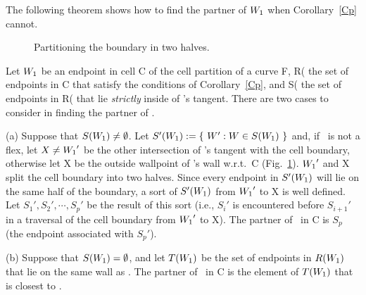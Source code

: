 The following theorem shows how to find the partner of $\mbox{$W_{1}$}$ when Corollary~\ref{Cp} cannot.

\begin{figure}[htb]\vspace{2.1in}\caption{Partitioning the boundary in two halves.}\label{3.8A}\end{figure}

\begin{theorem}
\label{Tpner}
Let $\mbox{$W_{1}$}$ be an endpoint in cell C of the cell partition of a curve F,
R{\rm (}\wo{\rm )} the set of endpoints
in C that satisfy the conditions of 
Corollary~{\rm \ref{Cp}},
%
and S{\rm (}\wo{\rm )} 
the set of endpoints in R{\rm (}\wo{\rm )} that lie {\em strictly} inside of \wo's 
tangent.
There are two cases to consider in finding the partner of \wo.

{\rm (a)} Suppose that $S(\mbox{$W_{1}$}) \neq \emptyset$. 
Let \mbox{$S'(\mbox{$W_{1}$}) := \{\ W':W \in S(\mbox{$W_{1}$})\ \}$} and, 
if \wo\ is not a flex, let $X \neq \mbox{$W_{1}$} '$ be the other intersection of \wo's 
tangent with the cell boundary, otherwise let X be the outside wallpoint of \wo's 
wall w.r.t.\ C {\rm (}Fig.~\ref{3.8A}{\rm )}.
$\mbox{$W_{1}$} '$ and X split the cell boundary into two halves.
Since every endpoint in $S'(\mbox{$W_{1}$})$ will lie on the same half of the boundary,
a sort of $S'(\mbox{$W_{1}$})$ from $\mbox{$W_{1}$} '$ to X is well defined.
Let $S_{1}',S_{2}',\cdots,S_{p}'$ be the result of this sort
{\rm (}i.e., $S_{i}'$ is encountered before $S_{i+1}'$ in a traversal of the cell boundary 
from $\mbox{$W_{1}$} '$ to X{\rm )}.
The partner of \wo\ in C is $S_{p}$ {\rm (}the endpoint associated with $S_{p}'${\rm )}.

{\rm (b)} Suppose that $S(\mbox{$W_{1}$}) = \emptyset$, and 
let $T(\mbox{$W_{1}$})$ be the set of endpoints in $R(\mbox{$W_{1}$})$ that lie on 
the same wall as \wo.
The partner of \wo\ in C is the element of $T(\mbox{$W_{1}$})$ that is closest to \wo.
\end{theorem}

